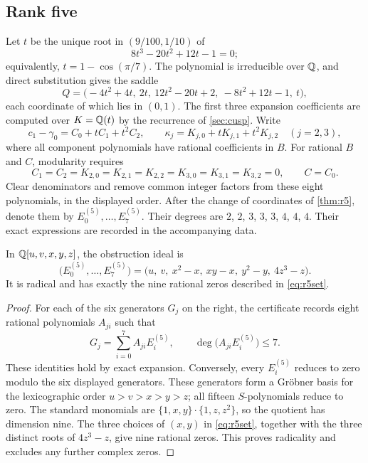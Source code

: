 \subsection{Rank five}\label{app:r5}
Let $t$ be the unique root in $(9/100,1/10)$ of
\[
8t^3-20t^2+12t-1=0;
\]
equivalently, $t=1-\cos(\pi/7)$. The polynomial is irreducible over $\mathbb{Q}$, and direct substitution gives the saddle
\[
Q=\bigl(-4t^2+4t,\ 2t,\ 12t^2-20t+2,\ -8t^2+12t-1,\ t\bigr),
\]
each coordinate of which lies in $(0,1)$. The first three expansion coefficients are computed over $K=\mathbb{Q}(t)$ by the recurrence of \cref{sec:cusp}. Write
\[
c_1-\gamma_0=C_0+tC_1+t^2C_2,\qquad \kappa_j=K_{j,0}+tK_{j,1}+t^2K_{j,2}\quad(j=2,3),
\]
where all component polynomials have rational coefficients in $B$. For rational $B$ and $C$, modularity requires
\[
C_1=C_2=K_{2,0}=K_{2,1}=K_{2,2}=K_{3,0}=K_{3,1}=K_{3,2}=0,\qquad C=C_0.
\]
Clear denominators and remove common integer factors from these eight polynomials, in the displayed order. After the change of coordinates of \cref{thm:r5}, denote them by $E^{(5)}_0,\dots,E^{(5)}_7$. Their degrees are $2$, $2$, $3$, $3$, $3$, $4$, $4$, $4$. Their exact expressions are recorded in the accompanying data.

\begin{lemma}\label{lem:r5elim}
In $\mathbb{Q}[u,v,x,y,z]$, the obstruction ideal is
\[
\bigl(E^{(5)}_0,\dots,E^{(5)}_7\bigr)=\bigl(u,\ v,\ x^2-x,\ xy-x,\ y^2-y,\ 4z^3-z\bigr).
\]
It is radical and has exactly the nine rational zeros described in \eqref{eq:r5set}.
\end{lemma}

\begin{proof}
For each of the six generators $G_j$ on the right, the certificate records eight rational polynomials $A_{ji}$ such that
\[
G_j=\sum_{i=0}^7A_{ji}E^{(5)}_i,\qquad \deg\bigl(A_{ji}E^{(5)}_i\bigr)\le7.
\]
These identities hold by exact expansion. Conversely, every $E^{(5)}_i$ reduces to zero modulo the six displayed generators. These generators form a Gr\"obner basis for the lexicographic order $u>v>x>y>z$; all fifteen $S$-polynomials reduce to zero. The standard monomials are $\{1,x,y\}\cdot\{1,z,z^2\}$, so the quotient has dimension nine. The three choices of $(x,y)$ in \eqref{eq:r5set}, together with the three distinct roots of $4z^3-z$, give nine rational zeros. This proves radicality and excludes any further complex zeros.
\end{proof}
